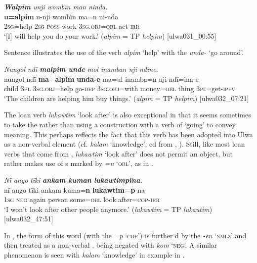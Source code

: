 \ea%
    \label{ex:loss:21}
          \textit{\textbf{Walpim} unji wombïn man ninda.}\\
\gll    \textbf{u=alpim}  u-nji    wombïn  ma=n      ni-nda\\
    2\textsc{sg}=help  2\textsc{sg-poss}  work    3\textsc{sg.obj=obl}  act-\textsc{irr}\\
\glt `[I] will help you do your work.’ (\textit{alpim} = TP \textit{helpim}) [ulwa031\_00:55]
\z

Sentence  illustrates the use of the verb \textit{alpim} ‘help’ with the  \textit{unda-} ‘go around’.

\ea%
    \label{ex:loss:28}
          \textit{Nungol ndï \textbf{malpim unde} mol inamban nji ndine.}\\
\gll    nungol  ndï  \textbf{ma=alpim}    \textbf{unda-e}  ma=ul      inamba=n nji    ndï=ina-e\\
    child  \textsc{3pl}  3\textsc{sg.obj}=help  go-\textsc{dep}  \textsc{3sg.obj=}with  money\textsc{=obl}    thing  3\textsc{pl}=get-\textsc{ipfv}\\
\glt `The children are helping him buy things.’ (\textit{alpim} = TP \textit{helpim}) [ulwa032\_07:21]
\z

The loan verb \textit{lukawtim} ‘look after’ is also exceptional in that it seems sometimes to take the  rather than using a  construction with a verb of ‘going’ to convey  meaning. This perhaps reflects the fact that this verb has been adopted into Ulwa as a non-verbal element (cf. \textit{kalam} ‘knowledge’, ed from , ). Still, like most loan verbs that come from , \textit{lukawtim} ‘look after’ does not permit an object, but rather makes use of  s marked by \textit{=n} ‘\textsc{obl}’, as in .

\ea%
    \label{ex:loss:29}
          \textit{Nï ango tïki \textbf{ankam kuman} \textbf{lukawtimpïna}.}\\
\gll nï    ango  tïki    ankam  kuma=\textbf{n}  \textbf{lukawtim=p}-na\\
    1\textsc{sg}  \textsc{neg}  again  person  some=\textsc{obl}  look.after\textsc{=cop}{}-\textsc{irr}\\
\glt `I won’t look after other people anymore.’ (\textit{lukawtim} = TP \textit{lukautim}) [ulwa032\_47:51]
\z

In , the  form of this word (with the  \textit{=p} ‘\textsc{cop}’) is further d by the   \textit{-en} ‘\textsc{nmlz}’ and then treated as a  non-verbal , being negated with  \textit{kom} ‘\textsc{neg}’. A similar phenomenon is seen with \textit{kalam} ‘knowledge’ in example  in .


